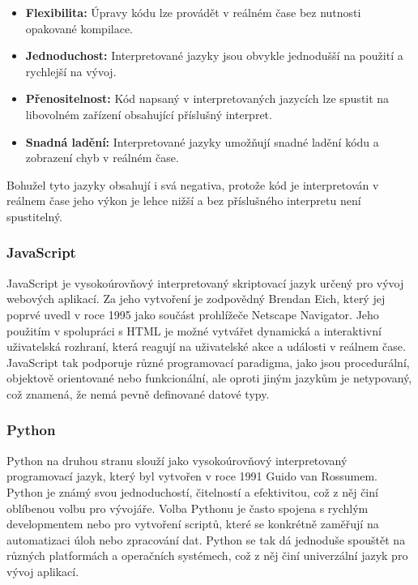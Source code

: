 \begin{itemize}
    \item \textbf{Flexibilita:} Úpravy kódu lze provádět v reálném čase bez nutnosti opakované kompilace.
    \item \textbf{Jednoduchost:} Interpretované jazyky jsou obvykle jednodušší na použití a rychlejší na vývoj.
    \item \textbf{Přenositelnost:} Kód napsaný v interpretovaných jazycích lze spustit na libovolném zařízení obsahující příslušný interpret.
    \item \textbf{Snadná ladění:} Interpretované jazyky umožňují snadné ladění kódu a zobrazení chyb v reálném čase.
\end{itemize}

Bohužel tyto jazyky obsahují i svá negativa, protože kód je interpretován v reálnem čase jeho výkon je lehce nižší a bez příslušného interpretu není spustitelný.

\subsubsection*{JavaScript}
\label{subsubsec:languages-interpreted-javascript}
JavaScript je vysokoúrovňový interpretovaný skriptovací jazyk určený pro vývoj webových aplikací. Za jeho vytvoření je zodpovědný Brendan Eich, který jej poprvé uvedl v roce 1995 jako součást prohlížeče Netscape Navigator. Jeho použitím v spolupráci s HTML je možné vytvářet dynamická a interaktivní uživatelská rozhraní, která reagují na uživatelské akce a události v reálnem čase. JavaScript tak podporuje různé programovací paradigma, jako jsou procedurální, objektově orientované nebo funkcionální, ale oproti jiným jazykům je netypovaný, což znamená, že nemá pevně definované datové typy.

\subsubsection*{Python}
\label{subsubsec:languages-interpreted-python}
Python na druhou stranu slouží jako vysokoúrovňový interpretovaný programovací jazyk, který byl vytvořen v roce 1991 Guido van Rossumem. Python je známý svou jednoduchostí, čitelností a efektivitou, což z něj činí oblíbenou volbu pro vývojáře. Volba Pythonu je často spojena s rychlým developmentem nebo pro vytvoření scriptů, které se konkrétně zaměřují na automatizaci úloh nebo zpracování dat. Python se tak dá jednoduše spouštět na různých platformách a operačních systémech, což z něj činí univerzální jazyk pro vývoj aplikací.

